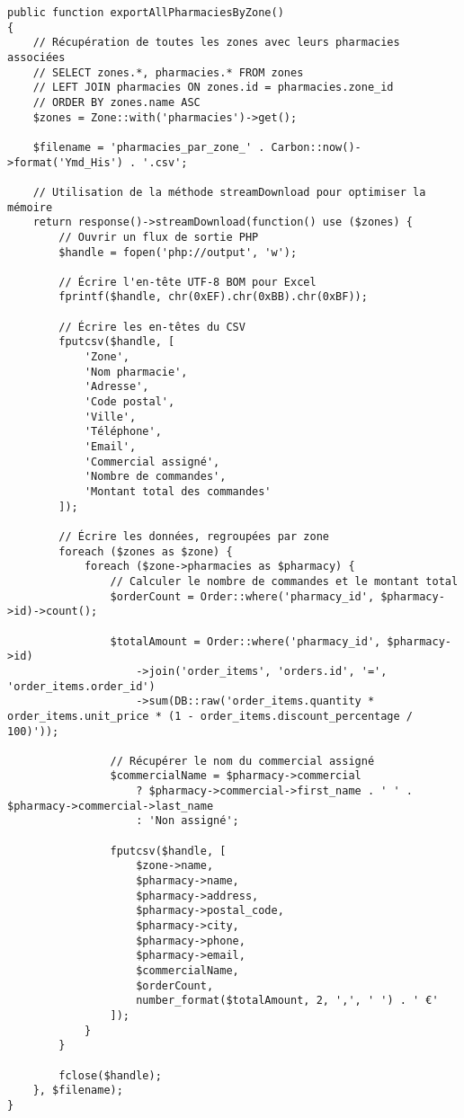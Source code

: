 \documentclass[12pt,a4paper]{article}
\begin{document}
\begin{lstlisting}[caption=Méthode exportAllPharmaciesByZone]
public function exportAllPharmaciesByZone()
{
    // Récupération de toutes les zones avec leurs pharmacies associées
    // SELECT zones.*, pharmacies.* FROM zones
    // LEFT JOIN pharmacies ON zones.id = pharmacies.zone_id
    // ORDER BY zones.name ASC
    $zones = Zone::with('pharmacies')->get();
    
    $filename = 'pharmacies_par_zone_' . Carbon::now()->format('Ymd_His') . '.csv';
    
    // Utilisation de la méthode streamDownload pour optimiser la mémoire
    return response()->streamDownload(function() use ($zones) {
        // Ouvrir un flux de sortie PHP
        $handle = fopen('php://output', 'w');
        
        // Écrire l'en-tête UTF-8 BOM pour Excel
        fprintf($handle, chr(0xEF).chr(0xBB).chr(0xBF));
        
        // Écrire les en-têtes du CSV
        fputcsv($handle, [
            'Zone',
            'Nom pharmacie',
            'Adresse',
            'Code postal',
            'Ville',
            'Téléphone',
            'Email',
            'Commercial assigné',
            'Nombre de commandes',
            'Montant total des commandes'
        ]);
        
        // Écrire les données, regroupées par zone
        foreach ($zones as $zone) {
            foreach ($zone->pharmacies as $pharmacy) {
                // Calculer le nombre de commandes et le montant total
                $orderCount = Order::where('pharmacy_id', $pharmacy->id)->count();
                
                $totalAmount = Order::where('pharmacy_id', $pharmacy->id)
                    ->join('order_items', 'orders.id', '=', 'order_items.order_id')
                    ->sum(DB::raw('order_items.quantity * order_items.unit_price * (1 - order_items.discount_percentage / 100)'));
                
                // Récupérer le nom du commercial assigné
                $commercialName = $pharmacy->commercial 
                    ? $pharmacy->commercial->first_name . ' ' . $pharmacy->commercial->last_name 
                    : 'Non assigné';
                
                fputcsv($handle, [
                    $zone->name,
                    $pharmacy->name,
                    $pharmacy->address,
                    $pharmacy->postal_code,
                    $pharmacy->city,
                    $pharmacy->phone,
                    $pharmacy->email,
                    $commercialName,
                    $orderCount,
                    number_format($totalAmount, 2, ',', ' ') . ' €'
                ]);
            }
        }
        
        fclose($handle);
    }, $filename);
}
\end{lstlisting}
\end{document}
